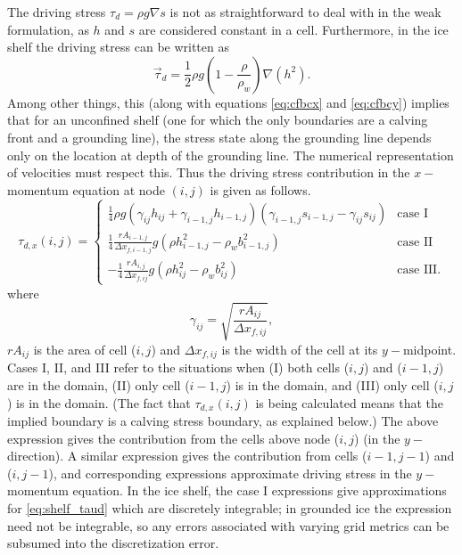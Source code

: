 The driving stress $\tau_d=\rho g \nabla s$ is not as straightforward to deal
with in the weak formulation, as $h$ and $s$ are 
considered constant in a cell. Furthermore, in the ice shelf the driving stress
can be written as
\begin{equation}
 \label{eq:shelf_taud}
 \vec{\tau}_d = \frac{1}{2}\rho g (1-\frac{\rho}{\rho_w})\nabla(h^2).
\end{equation}
Among other things, this (along with equations \ref{eq:cfbcx} and
\ref{eq:cfbcy}) implies that for an unconfined shelf (one for which the only
boundaries are a 
calving front and a grounding line), the stress state along the grounding line
depends
only on the location at depth of the grounding line. The numerical
representation of velocities
must respect this. Thus the driving stress contribution in the $x-$ momentum
equation at node $(i,j)$ is given as follows.
\begin{equation}
 \tau_{d,x}(i,j) = \begin{cases} 
                    \frac{1}{4}\rho g (\gamma_{ij}
h_{ij}+\gamma_{i-1,j}h_{i-1,j})(\gamma_{i-1,j}s_{i-1,j}-\gamma_{ij}s_{ij}) &
\mbox{case I} \\
                    \frac{1}{4} \frac{rA_{i-1,j}}{\Delta x_{f,i-1,j}} g (\rho
h_{i-1,j}^2 - \rho_w b_{i-1,j}^2) & \mbox{case II} \\
                    -\frac{1}{4} \frac{rA_{i,j}}{\Delta x_{f,ij}} g (\rho
h_{ij}^2 - \rho_w b_{ij}^2) & \mbox{case III}.
                   \end{cases}
\end{equation}
where 
\begin{equation}
 \gamma_{ij} = \sqrt{\frac{rA_{ij}}{\Delta x_{f,ij}}},
\end{equation}
$rA_{ij}$ is the area of cell ($i,j$) and $\Delta x_{f,ij}$ is the width of the
cell at its $y-$midpoint. Cases I, II, and III refer to the situations when (I)
both cells ($i,j$) and ($i-1,j$) are in the domain, (II) only cell ($i-1,j$) is
in the domain, and (III) only cell ($i,j$) is in the domain. (The fact that
$\tau_{d,x}(i,j)$ is being calculated means that the implied boundary is a
calving stress boundary, as explained below.) The above expression gives the
contribution
from the cells above node ($i,j$) (in the $y-$direction). A similar expression
gives the contribution from cells ($i-1,j-1$) and ($i,j-1$), and
corresponding expressions approximate driving stress in the $y-$ momentum
equation. In the ice shelf, the case I expressions give approximations for
\eqref{eq:shelf_taud} which are discretely integrable; in grounded ice the
expression need not be integrable, so any errors associated with varying grid
metrics
can be subsumed into the discretization error.

